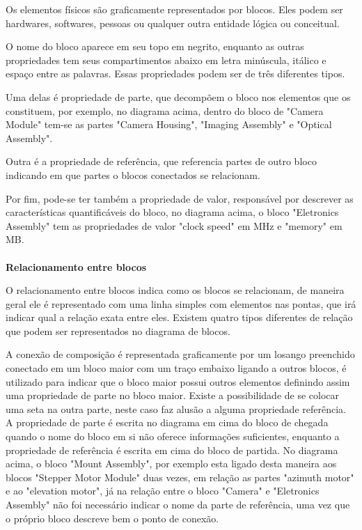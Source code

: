  
Os elementos físicos são graficamente representados por blocos. Eles podem ser hardwares, softwares, pessoas ou qualquer outra entidade lógica ou conceitual. 

O nome do bloco aparece em seu topo em negrito, enquanto as outras propriedades tem seus compartimentos abaixo em letra minúscula, itálico e espaço entre as palavras. Essas propriedades podem ser de três diferentes tipos. 

Uma delas é propriedade de parte, que decompõem o bloco nos elementos que os constituem, por exemplo, no diagrama acima, dentro do bloco de "Camera Module"  tem-se as partes "Camera Housing", "Imaging Assembly"  e "Optical Assembly".

Outra é a propriedade de referência, que referencia partes de outro bloco indicando em que partes o blocos conectados se relacionam. 

Por fim, pode-se ter também a propriedade de valor, responsável por descrever as características quantificáveis do bloco, no diagrama acima, o bloco "Eletronics Assembly"  tem as propriedades de valor "clock speed"  em MHz e "memory"  em MB.

\paragraph{}
 \textbf{Relacionamento entre blocos} 
 
O relacionamento entre blocos indica como os blocos se relacionam, de maneira geral ele é representado com uma linha simples com elementos nas pontas, que irá indicar qual a relação exata entre eles. Existem quatro tipos diferentes de relação que podem ser representados no diagrama de blocos.

A conexão de composição é representada graficamente por um losango preenchido conectado em um bloco maior com um traço embaixo ligando a outros blocos, é utilizado para indicar que o bloco maior possui outros elementos definindo assim uma propriedade de parte no bloco maior. Existe a possibilidade de se colocar uma seta na outra parte, neste caso faz alusão a alguma propriedade referência. A propriedade de parte é escrita no diagrama em cima do bloco de chegada quando o nome do bloco em si não oferece informações suficientes, enquanto a propriedade de referência é escrita em cima do bloco de partida. No diagrama acima, o bloco "Mount Assembly", por exemplo esta ligado desta maneira aos blocos "Stepper Motor Module" duas vezes, em relação as partes "azimuth motor" e ao "elevation motor", já na relação entre o bloco "Camera" e "Eletronics Assembly" não foi necessário indicar o nome da parte de referência, uma vez que o próprio bloco descreve bem o ponto de conexão.

